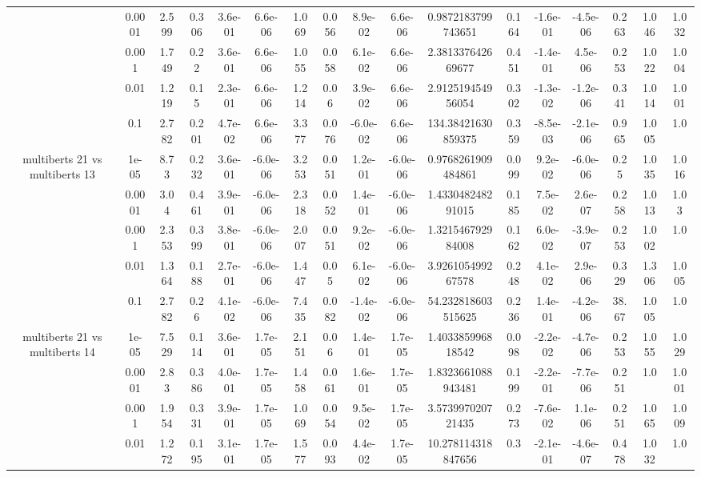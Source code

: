 \begin{tabular}{|c|c|c|c|c|c|c|c|c|c|c|c|c|c|c|c|c|}
 & 0.0001 & 2.599 & 0.306 & 3.6e-01 & 6.6e-06 & 1.069 & 0.056 & 8.9e-02 & 6.6e-06 & 0.9872183799743651 & 0.164 & -1.6e-01 & -4.5e-06 & 0.263 & 1.046 & 1.032 \\
 & 0.001 & 1.749 & 0.22 & 3.6e-01 & 6.6e-06 & 1.055 & 0.058 & 6.1e-02 & 6.6e-06 & 2.381337642669677 & 0.451 & -1.4e-01 & 4.5e-06 & 0.253 & 1.022 & 1.004 \\
 & 0.01 & 1.219 & 0.15 & 2.3e-01 & 6.6e-06 & 1.214 & 0.06 & 3.9e-02 & 6.6e-06 & 2.912519454956054 & 0.302 & -1.3e-02 & -1.2e-06 & 0.341 & 1.014 & 1.001 \\
 & 0.1 & 2.782 & 0.201 & 4.7e-02 & 6.6e-06 & 3.377 & 0.076 & -6.0e-02 & 6.6e-06 & 134.38421630859375 & 0.359 & -8.5e-03 & -2.1e-06 & 0.965 & 1.005 & 1.0 \\
\hline
\multirow{5}{*}{multiberts 21 vs multiberts 13} & 1e-05 & 8.73 & 0.232 & 3.6e-01 & -6.0e-06 & 3.253 & 0.051 & 1.2e-01 & -6.0e-06 & 0.9768261909484861 & 0.099 & 9.2e-02 & -6.0e-06 & 0.25 & 1.035 & 1.016 \\
 & 0.0001 & 3.04 & 0.461 & 3.9e-01 & -6.0e-06 & 2.318 & 0.052 & 1.4e-01 & -6.0e-06 & 1.433048248291015 & 0.185 & 7.5e-02 & 2.6e-07 & 0.258 & 1.013 & 1.03 \\
 & 0.001 & 2.353 & 0.399 & 3.8e-01 & -6.0e-06 & 2.007 & 0.051 & 9.2e-02 & -6.0e-06 & 1.321546792984008 & 0.162 & 6.0e-02 & -3.9e-07 & 0.253 & 1.002 & 1.0 \\
 & 0.01 & 1.364 & 0.188 & 2.7e-01 & -6.0e-06 & 1.447 & 0.05 & 6.1e-02 & -6.0e-06 & 3.926105499267578 & 0.248 & 4.1e-02 & 2.9e-06 & 0.329 & 1.306 & 1.005 \\
 & 0.1 & 2.782 & 0.26 & 4.1e-02 & -6.0e-06 & 7.435 & 0.082 & -1.4e-02 & -6.0e-06 & 54.232818603515625 & 0.236 & 1.4e-01 & -4.2e-06 & 38.67 & 1.005 & 1.0 \\
\hline
\multirow{5}{*}{multiberts 21 vs multiberts 14} & 1e-05 & 7.529 & 0.114 & 3.6e-01 & 1.7e-05 & 2.151 & 0.06 & 1.4e-01 & 1.7e-05 & 1.403385996818542 & 0.098 & -2.2e-02 & -4.7e-06 & 0.253 & 1.055 & 1.029 \\
 & 0.0001 & 2.83 & 0.386 & 4.0e-01 & 1.7e-05 & 1.458 & 0.061 & 1.6e-01 & 1.7e-05 & 1.8323661088943481 & 0.199 & -2.2e-01 & -7.7e-06 & 0.251 & 1.0 & 1.001 \\
 & 0.001 & 1.954 & 0.331 & 3.9e-01 & 1.7e-05 & 1.069 & 0.054 & 9.5e-02 & 1.7e-05 & 3.573997020721435 & 0.273 & -7.6e-02 & 1.1e-06 & 0.251 & 1.065 & 1.009 \\
 & 0.01 & 1.272 & 0.195 & 3.1e-01 & 1.7e-05 & 1.577 & 0.093 & 4.4e-02 & 1.7e-05 & 10.278114318847656 & 0.3 & -2.1e-01 & -4.6e-07 & 0.478 & 1.032 & 1.0 \\

\end{tabular}

